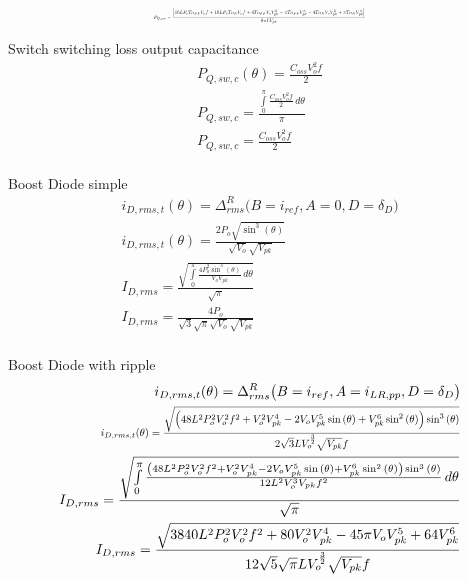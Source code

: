 \documentclass[12pt]{report}
\begin{document}
\begin{align}
\text{\scalebox{0.35}{$P_{Q,sw} = \frac{\left|{16 L P_{o} T_{OFF} V_{o} f + 16 L P_{o} T_{ON} V_{o} f + 4 T_{OFF} V_{o} V_{pk}^{2} - \pi T_{OFF} V_{pk}^{3} - 4 T_{ON} V_{o} V_{pk}^{2} + \pi T_{ON} V_{pk}^{3}}\right|}{8 \pi L V_{pk}}$}}\\
\end{align}

Switch switching loss output capacitance
\begin{align}
P_{Q,sw,c}(\theta) = \frac{C_{oss} V_{o}^{2} f}{2}\\
P_{Q,sw,c} = \frac{\int\limits_{0}^{\pi} \frac{C_{oss} V_{o}^{2} f}{2}\, d\theta}{\pi}\\
P_{Q,sw,c} = \frac{C_{oss} V_{o}^{2} f}{2}\\
\end{align}

Boost Diode simple
\begin{align}
i_{D,rms,t}(\theta) = \Delta^R_{rms} \big(B=i_{ref}, A=0, D=\delta_{D} \big)\\
i_{D,rms,t}(\theta) = \frac{2 P_{o} \sqrt{\sin^{3}{\left(\theta \right)}}}{\sqrt{V_{o}} \sqrt{V_{pk}}}\\
I_{D,rms} = \frac{\sqrt{\int\limits_{0}^{\pi} \frac{4 P_{o}^{2} \sin^{3}{\left(\theta \right)}}{V_{o} V_{pk}}\, d\theta}}{\sqrt{\pi}}\\
I_{D,rms} = \frac{4 P_{o}}{\sqrt{3} \sqrt{\pi} \sqrt{V_{o}} \sqrt{V_{pk}}}\\
\end{align}

Boost Diode with ripple
\begin{align}
i_{D,rms,t}(\theta) = \Delta^R_{rms} \big(B=i_{ref},A=i_{LR,pp},D=\delta_{D} \big)\\
\text{\scalebox{0.75}{$i_{D,rms,t}(\theta) = \frac{\sqrt{\left(48 L^{2} P_{o}^{2} V_{o}^{2} f^{2} + V_{o}^{2} V_{pk}^{4} - 2 V_{o} V_{pk}^{5} \sin{\left(\theta \right)} + V_{pk}^{6} \sin^{2}{\left(\theta \right)}\right) \sin^{3}{\left(\theta \right)}}}{2 \sqrt{3} L V_{o}^{\frac{3}{2}} \sqrt{V_{pk}} f}$}}\\
I_{D,rms} = \frac{\sqrt{\int\limits_{0}^{\pi} \frac{\left(48 L^{2} P_{o}^{2} V_{o}^{2} f^{2} + V_{o}^{2} V_{pk}^{4} - 2 V_{o} V_{pk}^{5} \sin{\left(\theta \right)} + V_{pk}^{6} \sin^{2}{\left(\theta \right)}\right) \sin^{3}{\left(\theta \right)}}{12 L^{2} V_{o}^{3} V_{pk} f^{2}}\, d\theta}}{\sqrt{\pi}}\\
I_{D,rms} = \frac{\sqrt{3840 L^{2} P_{o}^{2} V_{o}^{2} f^{2} + 80 V_{o}^{2} V_{pk}^{4} - 45 \pi V_{o} V_{pk}^{5} + 64 V_{pk}^{6}}}{12 \sqrt{5} \sqrt{\pi} L V_{o}^{\frac{3}{2}} \sqrt{V_{pk}} f}\\
\end{align}
\end{document}
